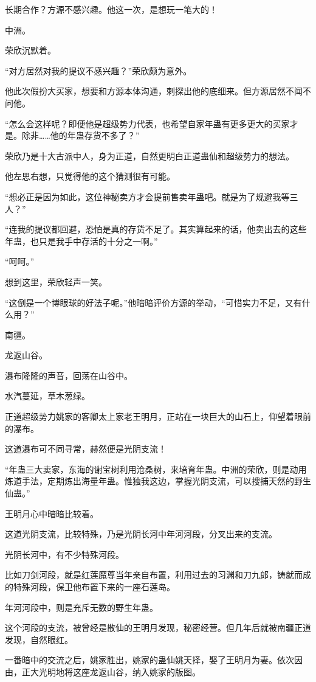 \begin{this_body}
长期合作？方源不感兴趣。他这一次，是想玩一笔大的！

中洲。

荣欣沉默着。

“对方居然对我的提议不感兴趣？”荣欣颇为意外。

他此次假扮大买家，想要和方源本体沟通，刺探出他的底细来。但方源居然不闻不问他。

“怎么会这样呢？即便他是超级势力代表，也希望自家年蛊有更多更大的买家才是。除非……他的年蛊存货不多了？”

荣欣乃是十大古派中人，身为正道，自然更明白正道蛊仙和超级势力的想法。

他左思右想，只觉得他的这个猜测很有可能。

“想必正是因为如此，这位神秘卖方才会提前售卖年蛊吧。就是为了规避我等三人？”

“连我的提议都回避，恐怕是真的存货不足了。其实算起来的话，他卖出去的这些年蛊，也只是我手中存活的十分之一啊。”

“呵呵。”

想到这里，荣欣轻声一笑。

“这倒是一个博眼球的好法子呢。”他暗暗评价方源的举动，“可惜实力不足，又有什么用？”

南疆。

龙返山谷。

瀑布隆隆的声音，回荡在山谷中。

水汽蔓延，草木葱绿。

正道超级势力姚家的客卿太上家老王明月，正站在一块巨大的山石上，仰望着眼前的瀑布。

这道瀑布可不同寻常，赫然便是光阴支流！

“年蛊三大卖家，东海的谢宝树利用沧桑树，来培育年蛊。中洲的荣欣，则是动用炼道手法，定期炼出海量年蛊。惟独我这边，掌握光阴支流，可以搜捕天然的野生仙蛊。”

王明月心中暗暗比较着。

这道光阴支流，比较特殊，乃是光阴长河中年河河段，分叉出来的支流。

光阴长河中，有不少特殊河段。

比如刀剑河段，就是红莲魔尊当年亲自布置，利用过去的习渊和刀九郎，铸就而成的特殊河段，保卫他布置下来的一座石莲岛。

年河河段中，则是充斥无数的野生年蛊。

这个河段的支流，被曾经是散仙的王明月发现，秘密经营。但几年后就被南疆正道发现，自然眼红。

一番暗中的交流之后，姚家胜出，姚家的蛊仙姚天择，娶了王明月为妻。依次因由，正大光明地将这座龙返山谷，纳入姚家的版图。


\end{this_body}
